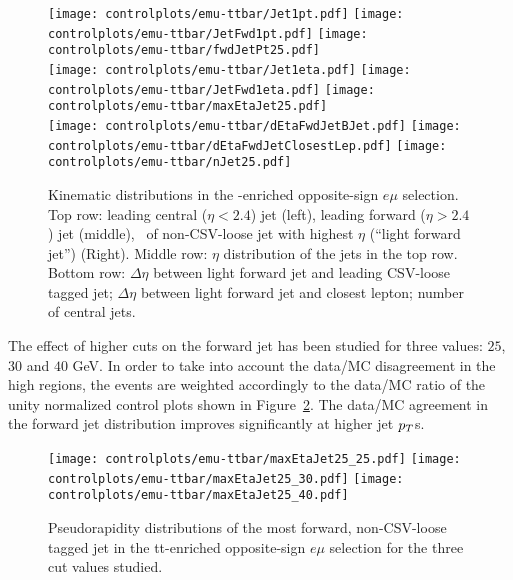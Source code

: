 \begin{figure} [!h]
  \centering
  \texttt{[image: controlplots/emu-ttbar/Jet1pt.pdf]}
  \texttt{[image: controlplots/emu-ttbar/JetFwd1pt.pdf]}
  \texttt{[image: controlplots/emu-ttbar/fwdJetPt25.pdf]} \\
  \texttt{[image: controlplots/emu-ttbar/Jet1eta.pdf]}
  \texttt{[image: controlplots/emu-ttbar/JetFwd1eta.pdf]}
  \texttt{[image: controlplots/emu-ttbar/maxEtaJet25.pdf]} \\
  \texttt{[image: controlplots/emu-ttbar/dEtaFwdJetBJet.pdf]}
  \texttt{[image: controlplots/emu-ttbar/dEtaFwdJetClosestLep.pdf]}
  \texttt{[image: controlplots/emu-ttbar/nJet25.pdf]} \\
\caption[Kinematic distributions for forward jet mismodeling study.]{Kinematic distributions in the \ttbar-enriched opposite-sign $e\mu$ selection. Top row: leading central ($\eta<2.4$) jet \pt (left), leading forward ($\eta>2.4$) jet \pt (middle), \pt\ of non-CSV-loose jet with highest $\eta$ (``light forward jet'') (Right). Middle row: $\eta$ distribution of the jets in the top row. Bottom row: $\Delta\eta$ between light forward jet and leading CSV-loose tagged jet; $\Delta\eta$ between light forward jet and closest lepton; number of central jets.}
\label{fig:osemu-ttbar}
\end{figure}

The effect of higher \pt cuts on the forward jet has been studied for three values: $25$, $30$ and $40$ GeV. In order to take into account the data/MC disagreement in the high \etac regions, the events are weighted accordingly to the data/MC ratio of the unity normalized control plots shown in Figure~\ref{fig:ptCutVar}. The data/MC agreement in the forward jet \etac distribution improves significantly at higher jet $p_T$s.

\begin{figure} [!h]
  \centering
  \texttt{[image: controlplots/emu-ttbar/maxEtaJet25\_25.pdf]}
  \texttt{[image: controlplots/emu-ttbar/maxEtaJet25\_30.pdf]}
  \texttt{[image: controlplots/emu-ttbar/maxEtaJet25\_40.pdf]}\\
\caption[Most forward jets \etac distributions]{Pseudorapidity distributions of the most forward, non-CSV-loose tagged jet in the tt-enriched opposite-sign $e\mu$ selection for the three \pt cut values studied.}
\label{fig:ptCutVar}
\end{figure}

